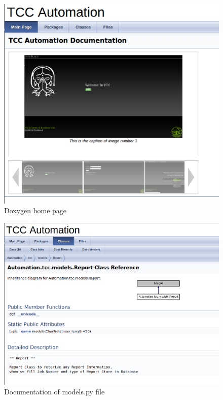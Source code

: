 \newpage
\begin{figure}[h]
\vskip 1cm
\centering \includegraphics[scale=1.0]{doc.png}
\caption{Doxygen home page}
\end{figure}
\newpage
\begin{figure}[h]
\vskip 1cm
\centering \includegraphics[scale=1.0]{doc3.png}
\caption{Documentation of models.py file}
\end{figure}
\newpage

